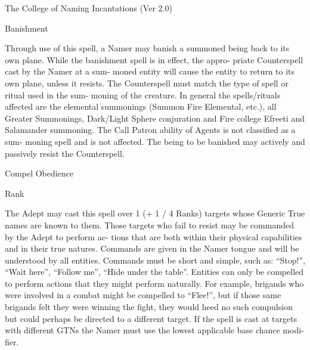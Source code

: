 \begin{Chapter}{The College of Naming Incantations (Ver 2.0)}
\begin{spell}[S-2]{Banishment }
\begin{effects}
 Through  use  of  this  spell,  a  Namer  may 
banish  a  summoned  being  back  to  its  own  plane. 
While  the  banishment  spell  is in  effect,  the  appro-
priate  Counterspell  cast  by  the  Namer  at  a  sum-
moned  entity  will  cause  the  entity  to  return  to  its 
own plane, unless it resists. The Counterspell must 
match  the  type  of  spell  or  ritual  used  in  the  sum-
moning of the creature. In general the spells/rituals 
affected  are  the  elemental  summonings  (Summon 
Fire  Elemental,  etc.),  all  Greater  Summonings, 
Dark/Light  Sphere  conjuration  and  Fire  college 
Efreeti  and  Salamander  summoning.  The  Call 
Patron ability of Agents is not classified as a sum-
moning  spell  and  is  not  affected.  The  being  to  be 
banished  may  actively  and  passively  resist  the 
Counterspell. 

\end{effects}
\end{spell}

\begin{spell}[S-3]{Compel Obedience }

Rank 
\begin{effects}
The Adept may cast this spell over 1 (+ 1 / 
4  Ranks)  targets  whose  Generic  True  names  are 
known  to  them.  Those  targets  who  fail  to  resist 
may  be  commanded  by  the  Adept  to  perform  ac-
tions that are both within their physical capabilities 
and  in  their  true  natures.  Commands  are  given  in 
the  Namer  tongue  and  will  be  understood  by  all 
entities. Commands must be short and simple, such 
as:  “Stop!”,  “Wait  here”,  “Follow  me”,  “Hide 
under the table”. Entities can only be compelled to 
perform actions that  they  might  perform naturally. 
For  example,  brigands  who  were  involved  in  a 
combat might be compelled to “Flee!”, but if those 
same  brigands  felt  they  were  winning  the  fight, 
they  would  heed  no  such  compulsion  but  could 
perhaps be directed to a different target. If the spell 
is  cast  at  targets  with  different  GTNs  the  Namer 
must  use  the  lowest  applicable  base  chance  modi-
fier. 


\end{effects}
\end{spell}
\end{Chapter}
